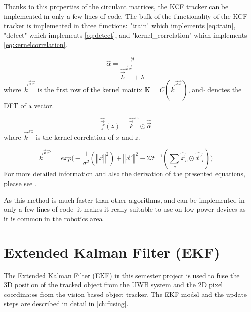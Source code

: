 Thanks to this properties of the circulant matrices, the KCF tracker can be implemented in only a few lines of code. The bulk of the functionality of the KCF tracker is implemented in three functions: "train" which implements \autoref{eq:train}, "detect" which implements \autoref{eq:detect}, and "kernel\_correlation" which implements \autoref{eq:kernelcorrelation}.

\begin{equation}\label{eq:train}
	\hat{\alpha} = \frac{\hat{y}}{\hat{\vec{k}}^{\vec x \vec x} + \lambda}
\end{equation}
where $\vec{k}^{\vec x \vec x}$ is the first row of the kernel matrix $\textbf{K}=C(\vec{k}^{\vec x \vec x})$, and $\hat{}$ denotes the DFT of a vector.

\begin{equation}\label{eq:detect}
	\hat{\vec f}(z) = \hat{\vec k}^{xz} \odot \hat{\vec \alpha}
\end{equation}
where $\vec k^{xz}$ is the kernel correlation of $x$ and $z$.

\begin{equation}\label{eq:kernelcorrelation}
	\vec{k}^{\vec x\vec x'} = \mathit{exp} \big( -\frac{1}{\sigma^2} (\left\Vert \vec x \right\Vert^2) + \left\Vert \vec x' \right\Vert^2 -2\mathcal{F}^{-1}(\sum_c \hat{\vec x}_c \odot \hat{\vec x'}_c) \big)
\end{equation}
For more detailed information and also the derivation of the presented equations, please see \cite{henriques2015tracking}.

As this method is much faster than other algorithms, and can be implemented in only a few lines of code, it makes it really suitable to use on low-power devices as it is common in the robotics area.

\section{Extended Kalman Filter (EKF)}
The Extended Kalman Filter (EKF) \cite{Chui2009} in this semester project is used to fuse the 3D position of the tracked object from the UWB system and the 2D pixel coordinates from the vision based object tracker. The EKF model and the update steps are described in detail in \autoref{ch:fusing}.